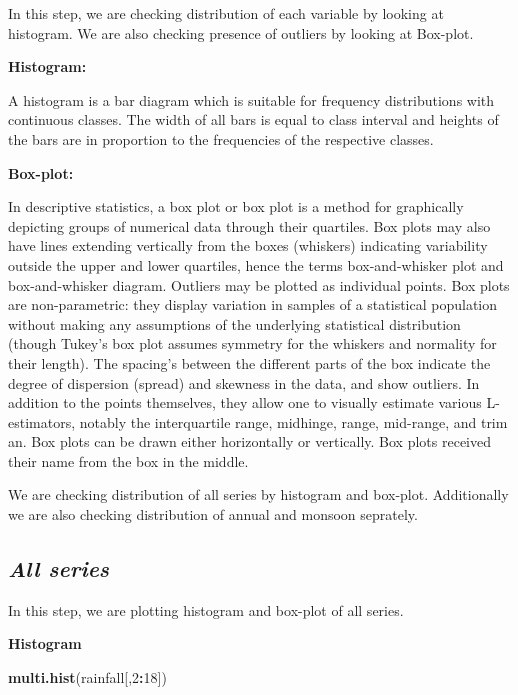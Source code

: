 \documentclass[12pt,openany]{book}
\newenvironment{Shaded}{\begin{snugshade}}{\end{snugshade}}
\newcommand{\DecValTok}[1]{\textcolor[rgb]{0.00,0.00,0.81}{#1}}
\newcommand{\KeywordTok}[1]{\textcolor[rgb]{0.13,0.29,0.53}{\textbf{#1}}}
\newcommand{\NormalTok}[1]{#1}
\newcommand{\OperatorTok}[1]{\textcolor[rgb]{0.81,0.36,0.00}{\textbf{#1}}}
\begin{document}
In this step, we are checking distribution of each variable by looking at histogram. We are also checking presence of outliers by looking at Box-plot.

\textbf{Histogram:}

A histogram is a bar diagram which is suitable for frequency distributions with continuous classes. The width of all bars is equal to class interval and heights of the bars are in proportion to the frequencies of the respective classes.

\textbf{Box-plot:}

In descriptive statistics, a box plot or box plot is a method for graphically depicting groups of numerical data through their quartiles. Box plots may also have lines extending vertically from the boxes (whiskers) indicating variability outside the upper and lower quartiles, hence the terms box-and-whisker plot and box-and-whisker diagram. Outliers may be plotted as individual points. Box plots are non-parametric: they display variation in samples of a statistical population without making any assumptions of the underlying statistical distribution (though Tukey's box plot assumes symmetry for the whiskers and normality for their length). The spacing's between the different parts of the box indicate the degree of dispersion (spread) and skewness in the data, and show outliers. In addition to the points themselves, they allow one to visually estimate various L-estimators, notably the interquartile range, midhinge, range, mid-range, and trim an. Box plots can be drawn either horizontally or vertically. Box plots received their name from the box in the middle.

We are checking distribution of all series by histogram and box-plot. Additionally we are also checking distribution of annual and monsoon seprately.

\hypertarget{all-series}{%
\subsection{\texorpdfstring{\emph{All series}}{All series}}\label{all-series}}

In this step, we are plotting histogram and box-plot of all series.

\textbf{Histogram}

\begin{Shaded}
\begin{Highlighting}[]
\KeywordTok{multi.hist}\NormalTok{(rainfall[,}\DecValTok{2}\OperatorTok{:}\DecValTok{18}\NormalTok{])}
\end{Highlighting}
\end{Shaded}
\end{document}
